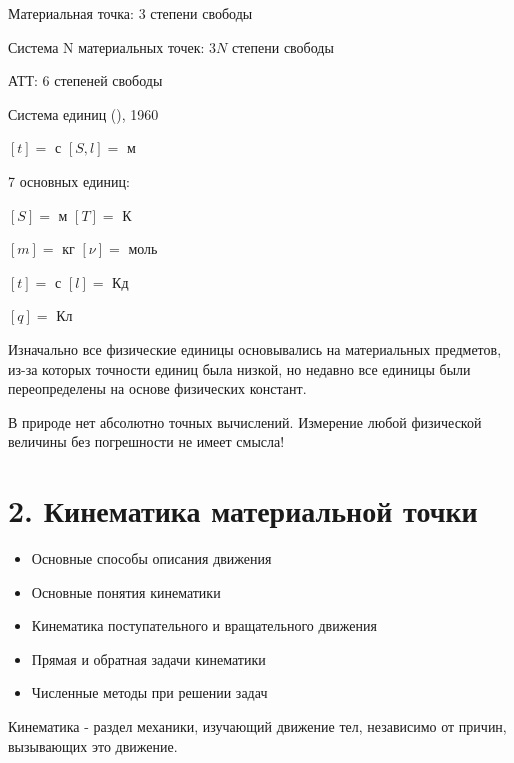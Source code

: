 \documentclass[12pt]{article}
\begin{document}
    Материальная точка: $3$ степени свободы

    Система N материальных точек: $3N$ степени свободы

    АТТ: $6$ степеней свободы

    Система единиц (), 1960

    $[t] = $ с \quad $[S, l] = $ м

    7 основных единиц:

    $[S] = $ м \quad $[T] = $ К

    $[m] = $ кг \quad $[\nu] = $ моль

    $[t] = $ с \quad $[l] = $ Кд

    $[q] = $ Кл

    Изначально все физические единицы основывались на материальных предметов, из-за которых точности единиц была низкой,
    но недавно все единицы были переопределены на основе физических констант.

    В природе нет абсолютно точных вычислений. Измерение любой физической величины без погрешности не имеет смысла!


    \section{2. Кинематика материальной точки}

    \begin{tcolorbox}[colframe=blue!25, colback=blue!10, title=\textbf{План лекции}]

        \footnotesize
        \begin{itemize}
            \item Основные способы описания движения

            \item Основные понятия кинематики

            \item Кинематика поступательного и вращательного движения

            \item Прямая и обратная задачи кинематики

            \item Численные методы при решении задач
        \end{itemize}
    \end{tcolorbox}

    \Def Кинематика - раздел механики, изучающий движение тел, независимо от причин, вызывающих это движение.
\end{document}
